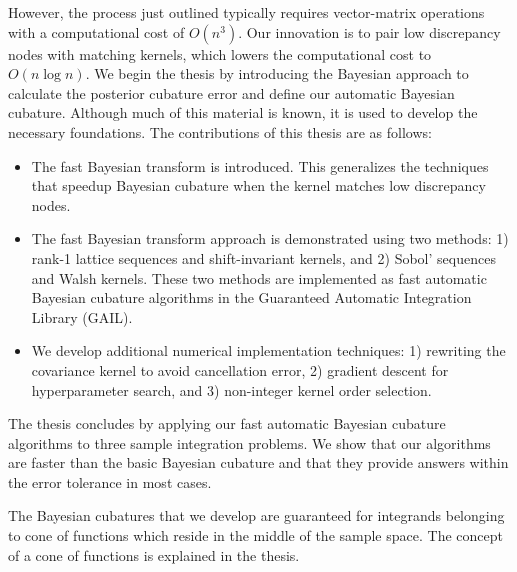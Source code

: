 \documentclass[12pt]{report}
\begin{document}
	However, the process just outlined typically requires vector-matrix operations  with a computational cost of $O(n^3)$. Our innovation is to pair low discrepancy nodes with matching kernels, which lowers the computational cost to $O(n \log n)$. 
	We begin the thesis by introducing the Bayesian approach to calculate the posterior cubature error and define our automatic Bayesian cubature. Although much of this material is known, it is used to develop the necessary foundations.
	The contributions of this thesis are as follows:
	\begin{itemize}
		\item The fast Bayesian transform is introduced. This generalizes the techniques that speedup Bayesian cubature when the kernel matches low discrepancy nodes.
		\item The fast Bayesian transform approach is demonstrated using two methods: 1) rank-1 lattice sequences and shift-invariant kernels, and 2) Sobol' sequences and Walsh kernels.
		These two methods are implemented as fast automatic Bayesian cubature algorithms in the Guaranteed Automatic Integration Library (GAIL).
		\item We develop additional numerical implementation techniques: 
		1) rewriting the covariance kernel to avoid cancellation error, 
		2) gradient descent for hyperparameter search, and
		3) non-integer kernel order selection.
	\end{itemize}
	The thesis concludes by applying our fast automatic Bayesian cubature algorithms to three sample integration problems. We show that our algorithms are faster than the basic Bayesian cubature and that they provide answers within the error tolerance in most cases. %
	
	The Bayesian cubatures that we develop are guaranteed for integrands belonging to cone of functions which reside in the middle of the sample space. The concept of a cone of functions is explained in the thesis.
	


\end{document}
